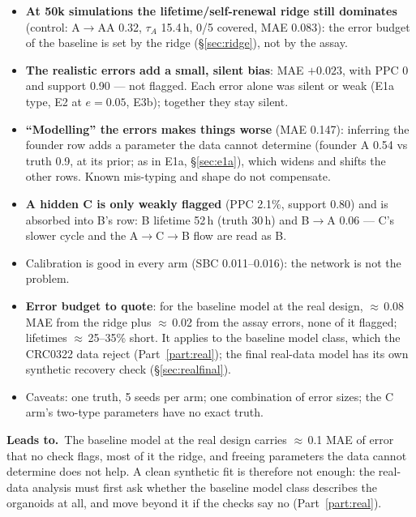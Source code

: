 \documentclass[10pt,a4paper]{article}
\newcommand{\tA}{$\tau_A$}
\newcommand{\Leads}[1]{\begin{leadbox}{\sffamily\bfseries\color{caqua!70!black}Leads to.}\ #1\end{leadbox}}
\begin{document}
\begin{itemize}
\item \textbf{At 50k simulations the lifetime/self-renewal ridge still dominates} (control: A$\to$AA 0.32, \tA{} 15.4\,h, 0/5 covered, MAE 0.083): the error budget of the baseline is set by the ridge (\S\ref{sec:ridge}), not by the assay.
\item \textbf{The realistic errors add a small, silent bias}: MAE $+0.023$, with PPC 0 and support 0.90 --- not flagged. Each error alone was silent or weak (E1a type, E2 at $e = 0.05$, E3b); together they stay silent.
\item \textbf{``Modelling'' the errors makes things worse} (MAE 0.147): inferring the founder row adds a parameter the data cannot determine (founder A 0.54 vs truth 0.9, at its prior; as in E1a, \S\ref{sec:e1a}), which widens and shifts the other rows. Known mis-typing and shape do not compensate.
\item \textbf{A hidden C is only weakly flagged} (PPC 2.1\%, support 0.80) and is absorbed into B's row: B lifetime 52\,h (truth 30\,h) and B$\to$A 0.06 --- C's slower cycle and the A$\to$C$\to$B flow are read as B.
\item Calibration is good in every arm (SBC 0.011--0.016): the network is not the problem.
\item \textbf{Error budget to quote}: for the baseline model at the real design, $\approx$\,0.08 MAE from the ridge plus $\approx$\,0.02 from the assay errors, none of it flagged; lifetimes $\approx$\,25--35\% short. It applies to the baseline model class, which the CRC0322 data reject (Part~\ref{part:real}); the final real-data model has its own synthetic recovery check (\S\ref{sec:realfinal}).
\item Caveats: one truth, 5 seeds per arm; one combination of error sizes; the C arm's two-type parameters have no exact truth.
\end{itemize}
\Leads{The baseline model at the real design carries $\approx$\,0.1 MAE of error that no check flags, most of it the ridge, and freeing parameters the data cannot determine does not help. A clean synthetic fit is therefore not enough: the real-data analysis must first ask whether the baseline model class describes the organoids at all, and move beyond it if the checks say no (Part~\ref{part:real}).}

\clearpage
\end{document}
